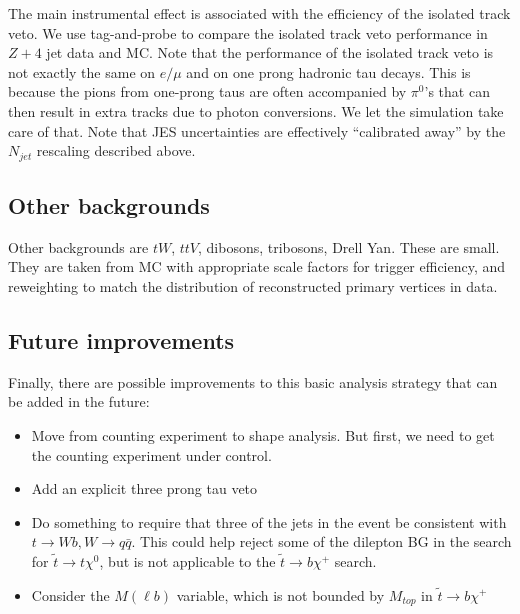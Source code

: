 The main instrumental effect is associated with the efficiency of the isolated track veto.
We use tag-and-probe to compare the isolated track veto performance in $Z + 4$ jet data and 
MC.  Note that the performance of the isolated track veto 
is not exactly the same on $e/\mu$ and on one prong hadronic tau decays.  This is because
the pions from one-prong taus are often accompanied by $\pi^0$'s that can then result in extra 
tracks due to photon conversions.  We let the simulation take care of that.  
Note that JES uncertainties are effectively ``calibrated away'' by the $N_{jet}$ rescaling described above.  



\subsection{Other backgrounds}
\label{sec:other-general}
Other backgrounds are $tW$, $ttV$, dibosons, tribosons, Drell Yan.
These  are small.  They are taken from MC with appropriate scale
factors for trigger efficiency, and reweighting to match the distribution of reconstructed primary vertices in data.


\subsection{Future improvements}
\label{sec:improvements-general}
Finally, there are possible improvements to this basic analysis strategy that can be added in the future:
\begin{itemize}
\item Move from counting experiment to shape analysis.  But first, we need to get the counting
experiment under control.
\item Add an explicit three prong tau veto
\item Do something to require that three of the jets in the event be consistent with $t \to Wb, W \to q\bar{q}$.
This could help reject some of the dilepton BG in the search for $\widetilde{t} \to t \chi^0$, 
but is not applicable to the $\widetilde{t} \to b \chi^+$ search.
\item Consider the $M(\ell b)$ variable, which is not bounded by $M_{top}$ in $\widetilde{t} \to b \chi^+$
\end{itemize}

